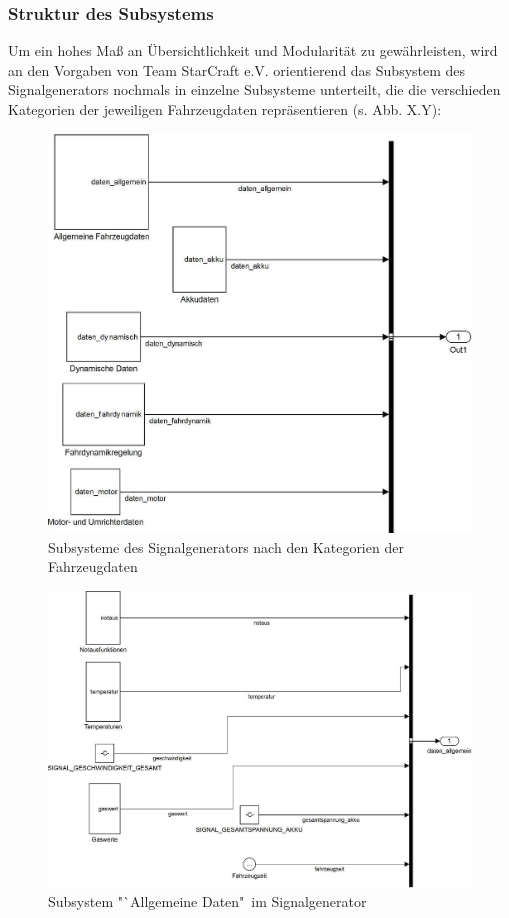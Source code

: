 \documentclass[fontsize = 12pt, paper = a4]{scrreprt}
\begin{document}
\newpage

\subsubsection{Struktur des Subsystems}

Um ein hohes Maß an Übersichtlichkeit und Modularität zu gewährleisten, wird an den Vorgaben von Team StarCraft e.V. orientierend das Subsystem des Signalgenerators nochmals in einzelne Subsysteme unterteilt, die die verschieden Kategorien der jeweiligen Fahrzeugdaten repräsentieren (s. Abb. X.Y): \\

\begin{figure}[h]
\centering
\includegraphics[scale = 0.85]{signalgen}
\caption{Subsysteme des Signalgenerators nach den Kategorien der Fahrzeugdaten}
\end{figure}

\newpage

\begin{figure}[h]
\centering
\includegraphics[scale = 0.65]{suballgemein}
\caption{Subsystem "`Allgemeine Daten"\ im Signalgenerator}
\end{figure}
\end{document}
